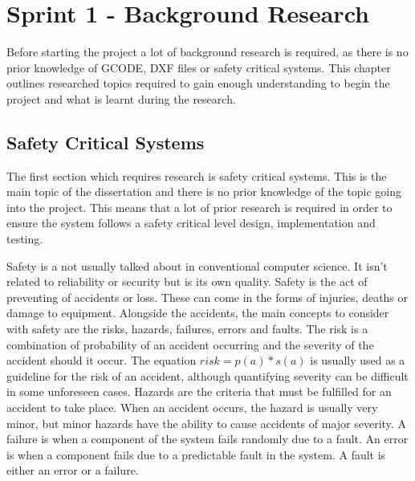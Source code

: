 \chapter{Sprint 1 - Background Research}
	\label{chap:background}
		
	Before starting the project a lot of background research is required, as there is no prior knowledge of GCODE, DXF files or safety critical systems. This chapter outlines researched topics required to gain enough understanding to begin the project and what is learnt during the research.

	\section{Safety Critical Systems}
		\label{sec:safety}

		The first section which requires research is safety critical systems. This is the main topic of the dissertation and there is no prior knowledge of the topic going into the project. This means that a lot of prior research is required in order to ensure the system follows a safety critical level design, implementation and testing.

		Safety is a not usually talked about in conventional computer science. It isn't related to reliability or security but is its own quality. Safety is the act of preventing of accidents or loss. These can come in the forms of injuries, deaths or damage to equipment. Alongside the accidents, the main concepts to consider with safety are the risks, hazards, failures, errors and faults. The risk is a combination of probability of an accident occurring and the severity of the accident should it occur. The equation $risk = p(a) * s(a)$ is usually used as a guideline for the risk of an accident, although quantifying severity can be difficult in some unforeseen cases. Hazards are the criteria that must be fulfilled for an accident to take place. When an accident occurs, the hazard is usually very minor, but minor hazards have the ability to cause accidents of major severity. A failure is when a component of the system fails randomly due to a fault. An error is when a component fails due to a predictable fault in the system. A fault is either an error or a failure.
			
